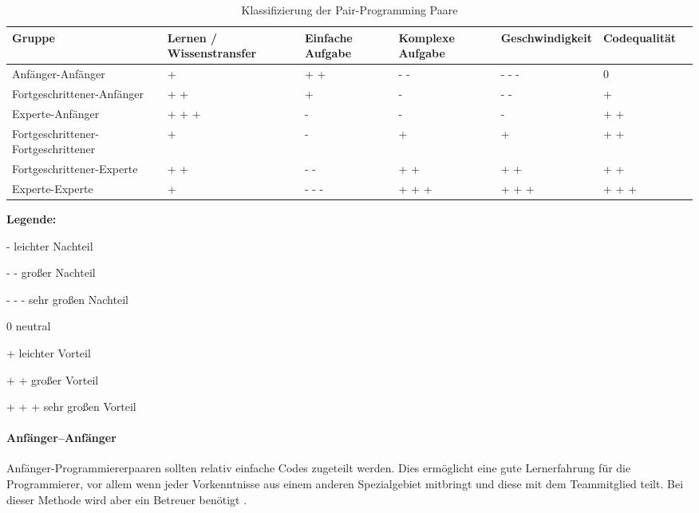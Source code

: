 \begin{table*}[tb]
\renewcommand{\arraystretch}{1.3}
\caption{Klassifizierung der Pair-Programming Paare }

\label{table:PPKlassifizierungPaare}
\centering
\begin{threeparttable}
\begin{tabularx}{\textwidth}{@{}Xllllll@{}}
\toprule
Gruppe & Lernen / Wissenstransfer  &  Einfache Aufgabe  &  Komplexe Aufgabe & Geschwindigkeit & Codequalität &  \\ \midrule
Anfänger-Anfänger &+ & + + & - - & - - -& 0& \\
Fortgeschrittener-Anfänger &+ + & + &-  &- - & +& \\
Experte-Anfänger & + + + & - & - &- & + +& \\
Fortgeschrittener-Fortgeschrittener& + & - & + & +& + +& \\
Fortgeschrittener-Experte &+ +  &- -  & + + &+ + & + +& \\
Experte-Experte & + &- - -  &+ + +  &+ + +  & + + +&\\ \bottomrule
\end{tabularx}
\medskip
      \footnotesize\textbf{Legende:}\smallskip
      \begin{tablenotes}\footnotesize
      \item{-} leichter Nachteil
      \item{- -} großer Nachteil
      \item{- - -} sehr großen Nachteil
      \item{0} neutral
      \item{+} leichter Vorteil
      \item{+ +} großer Vorteil
      \item{+ + +} sehr großen Vorteil
      \end{tablenotes}
      \end{threeparttable}
\end{table*}


\paragraph {Anfänger–Anfänger} Anfänger-Programmiererpaaren sollten relativ einfache Codes zugeteilt werden. Dies ermöglicht eine gute Lernerfahrung für die Programmierer, vor allem wenn jeder Vorkenntnisse aus einem anderen Spezialgebiet mitbringt und diese mit dem Teammitglied teilt. Bei dieser Methode wird aber ein Betreuer benötigt \cite{Alshehri2014RankingProgramming}.


